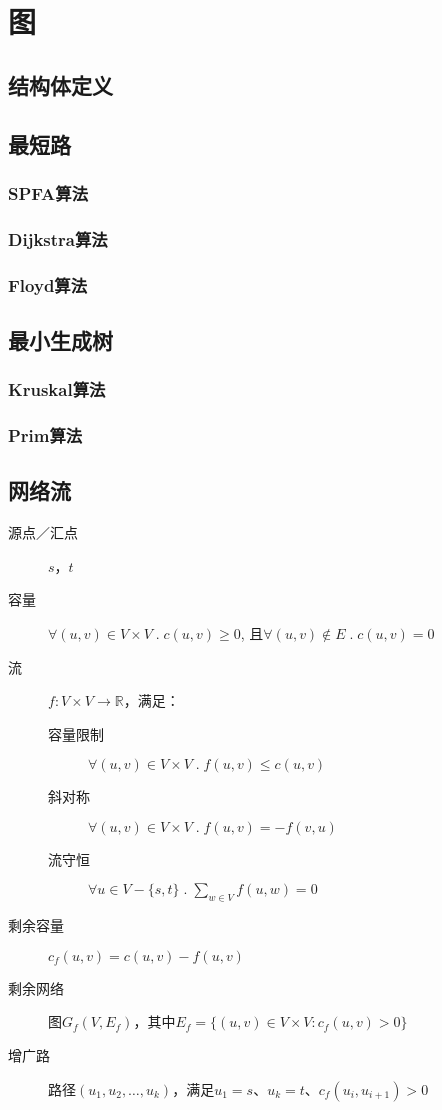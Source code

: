 
\section{图}
\subsection{结构体定义}

\subsection{最短路}
\subsubsection{SPFA算法}
\subsubsection{Dijkstra算法}
\subsubsection{Floyd算法}

\subsection{最小生成树}
\subsubsection{Kruskal算法}
\subsubsection{Prim算法}

\subsection{网络流}
\begin{description}
\item[源点／汇点] $s$，$t$
\item[容量] $\forall (u, v)  \in V \times V \;.\; c(u, v) \geqslant 0$, 且$\forall (u, v) \not\in E\;.\; c(u,v) = 0$
\item[流] $f:V \times V \rightarrow \mathbb{R} $，满足：
\begin{description}
\item[容量限制] $\forall (u, v) \in V \times V \;.\; f(u, v) \leqslant c(u, v) $
\item[斜对称] $\forall (u, v) \in V \times V \;.\; f(u, v) = -f(v, u)$
\item[流守恒] $\forall u \in V-\{s, t\} \;.\;\sum_{w \in V} f(u, w) = 0$
\end{description}
\item[剩余容量] $c_f(u,v) = c(u,v) - f(u,v)$
\item[剩余网络] 图$G_f(V, E_f)$，其中$E_f = \{(u,v) \in V \times V : c_f(u, v) > 0\}$
\item[增广路] 路径$(u_1, u_2, \dots, u_k)$，满足$u_1 = s$、$u_k = t$、$c_f(u_i, u_{i+1}) > 0$
\end{description}
